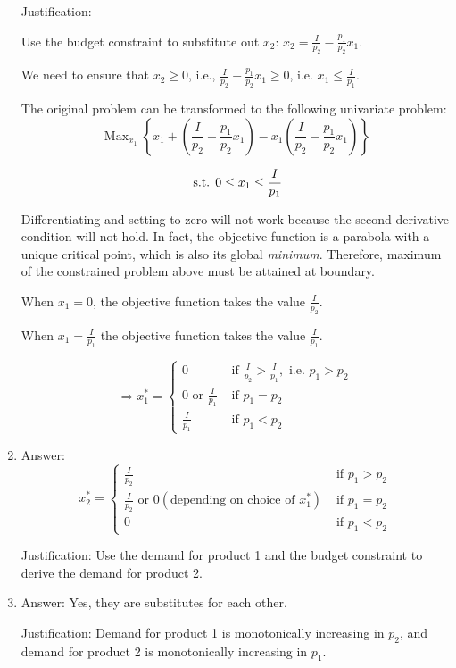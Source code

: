 \documentclass{article}
\newenvironment{solution}{\color{red}}{\color{black}}
\DeclareMathOperator*{\Max}{Max}
\newcommand{\st}{\hbox{ s.t. }}
\begin{document}
\begin{solution}
\begin{enumerate}
Justification: 

Use the budget constraint to substitute out $x_2$: $x_2=\frac{I}{p_2}-\frac{p_1}{p_2}x_1$.

We need to ensure that $x_2 \geq 0$, i.e., $\frac{I}{p_2}-\frac{p_1}{p_2}x_1 \geq 0$, i.e. $x_1 \leq \frac{I}{p_1}$.

The original problem can be transformed to the following univariate problem:
\[ \Max_{x_1} \left\{ x_1 + \left( \frac{I}{p_2} - \frac{p_1}{p_2} x_1 \right) - x_1 \left( \frac{I}{p_2}-\frac{p_1}{p_2} x_1\right) \right\} \]

\[ \st 0 \leq x_1 \leq \frac{I}{p_1} \]

Differentiating and setting to zero will not work because the second derivative condition will not hold. In fact, the objective function is a parabola with a unique critical point, which is also its global \textit{minimum}. Therefore, maximum of the constrained problem above must be attained at boundary.

When $x_1=0$, the objective function takes the value $\frac{I}{p_2}$.

When $x_1 = \frac{I}{p_1}$ the objective function takes the value $\frac{I}{p_1}$.

\[
\Rightarrow x_1^* = \left\{
\begin{array}{ll}
0 & \text{ if }\frac{I}{p_2}>\frac{I}{p_1},\text{ i.e. } p_1>p_2 \\
0 \text{ or } \frac{I}{p_1} & \text{ if }p_1=p_2 \\
\frac{I}{p_1} & \text{ if } p_1<p_2
\end{array}
\right.
\]

\item 
Answer: 
\[
x_2^* = \left\{
\begin{array}{ll}
\frac{I}{p_2} & \text{ if } p_1>p_2 \\
\frac{I}{p_2} \text{ or } 0 (\text{depending on choice of } x_1^*) & \text{ if } p_1=p_2 \\
0 & \text{ if } p_1<p_2
\end{array}
\right.
\]

Justification: Use the demand for product 1 and the budget constraint to derive the demand for product 2.

\item 
Answer: Yes, they are substitutes for each other.

Justification: Demand for product 1 is monotonically increasing in $p_2$, and demand for product 2 is monotonically increasing in $p_1$. 
\end{enumerate}

\end{solution}
\end{document}
